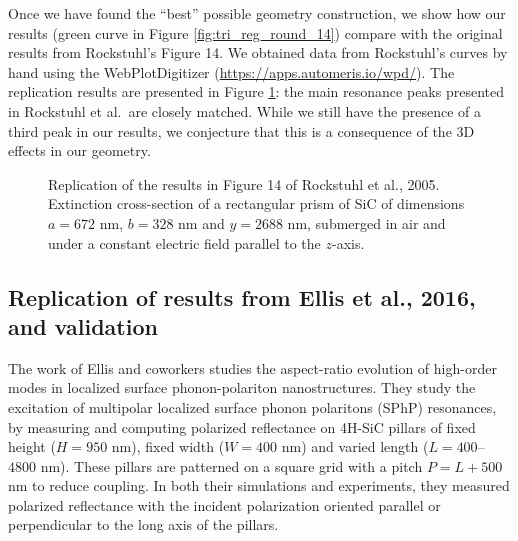Once we have found the ``best'' possible geometry construction, we show how our results 
(green curve in Figure \ref{fig:tri_reg_round_14}) compare 
with the original results from Rockstuhl's Figure 14. We obtained data from Rockstuhl's curves by hand using 
the WebPlotDigitizer (\url{https://apps.automeris.io/wpd/}). The replication results are 
presented in Figure \ref{fig:rep_14}: the main resonance peaks presented in Rockstuhl et al.\ are 
closely matched. While we still have the presence of a third peak in our results, we conjecture 
that this is a consequence of the 3D effects in our geometry.

 \begin{figure}
    \centering
    \caption{Replication of the results in Figure 14 of Rockstuhl et al., 2005. Extinction cross-section of a
    rectangular prism of SiC of dimensions $a=672$ nm, $b=328$ nm and $y=2688$ nm, submerged
    in air and under a constant electric field parallel to the $z$-axis.}
    \label{fig:rep_14}
 \end{figure}


 \subsection{Replication of results from Ellis et al., 2016, and validation}\label{sec:replication2}

The work of Ellis and coworkers \cite{ellis2016} studies the aspect-ratio evolution of high-order
modes in localized surface phonon-polariton nanostructures. They study the
excitation of multipolar localized surface phonon polaritons (SPhP) resonances, by measuring
and computing polarized reflectance on 4H-SiC pillars of fixed height ($H=950$ nm), fixed 
width ($W=400$ nm) and varied length ($L=400$--$4800$ nm). These pillars are patterned on a square 
grid with a pitch $P=L+500$ nm to reduce coupling. In both their simulations and experiments, they 
measured polarized reflectance with the incident polarization 
oriented parallel or perpendicular to the long axis of the pillars.  


